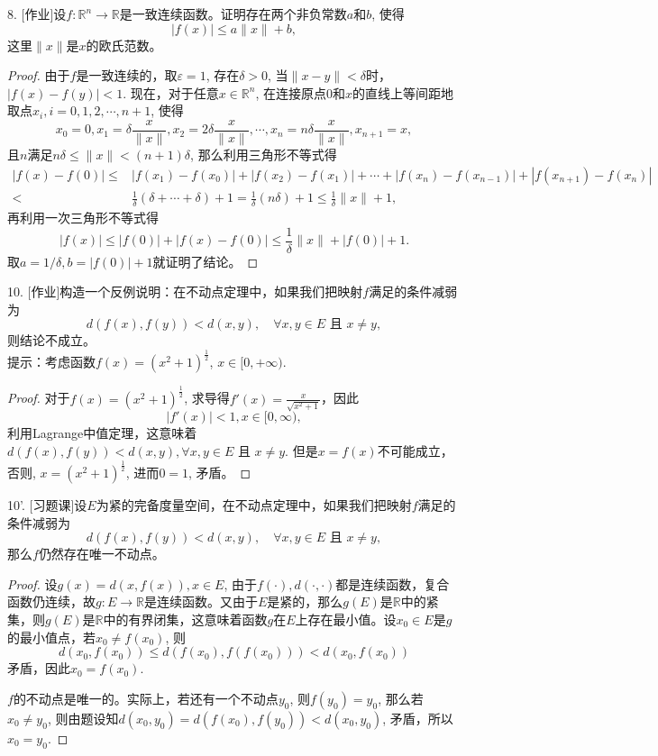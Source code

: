 \documentclass[a4paper,8pt]{ctexart}\textwidth 140mm \textheight 216mm
\newcommand{\e}{\varepsilon}
\newcommand{\8}{\infty}
\begin{document}
8. [作业]设$f:\mathbb{R}^n\to\mathbb{R}$是一致连续函数。证明存在两个非负常数$a$和$b$, 使得
$$|f(x)|\leq a\|x\|+b,$$
这里$\|x\|$是$x$的欧氏范数。
\begin{proof}
	由于$f$是一致连续的，取$\e=1$, 存在$\delta>0$, 当$\|x-y\|<\delta$时，$|f(x)-f(y)|<1$. 现在，对于任意$x\in\mathbb{R}^n$, 在连接原点$0$和$x$的直线上等间距地取点$x_i,i=0,1,2,\cdots,n+1$, 使得
	$$x_0=0,x_1=\delta\frac{x}{\|x\|},x_2=2\delta\frac{x}{\|x\|},\cdots,x_n=n\delta\frac{x}{\|x\|},x_{n+1}=x,$$
	且$n$满足$n\delta\leq \|x\|<(n+1)\delta$, 那么利用三角形不等式得
	\[\begin{split}
	|f(x)-f(0)|\leq& |f(x_1)-f(x_0)|+|f(x_2)-f(x_1)|+\cdots+|f(x_n)-f(x_{n-1})|+|f(x_{n+1})-f(x_n)|\\
	< & \frac{1}{\delta}(\delta+\cdots+\delta)+1=\frac{1}{\delta}(n\delta)+1\leq \frac{1}{\delta}\|x\|+1,
	\end{split}\]
	再利用一次三角形不等式得
	$$|f(x)|\leq |f(0)|+|f(x)-f(0)|\leq \frac{1}{\delta}\|x\|+|f(0)|+1.$$
	取$a=1/\delta, b=|f(0)|+1$就证明了结论。
\end{proof}

10. [作业]构造一个反例说明：在不动点定理中，如果我们把映射$f$满足的条件减弱为
$$d(f(x),f(y))<d(x,y),\quad\forall x,y\in E\mbox{ 且 }x\ne y,$$
则结论不成立。\\
提示：考虑函数$f(x)=(x^2+1)^{\frac{1}{2}}$, $x\in[0,+\infty)$.
\begin{proof}
	对于$f(x)=(x^2+1)^{\frac{1}{2}}$, 求导得$f'(x)=\frac{x}{\sqrt{x^2+1}}$，因此
	$$|f'(x)|<1,x\in[0,\infty),$$
	利用Lagrange中值定理，这意味着$d(f(x),f(y))<d(x,y),\forall x,y\in E\mbox{ 且 }x\ne y$. 但是$x=f(x)$不可能成立，否则, $x=(x^2+1)^{\frac{1}{2}}$, 进而$0=1$, 矛盾。 
\end{proof}

10'. [习题课]设$E$为紧的完备度量空间，在不动点定理中，如果我们把映射$f$满足的条件减弱为
$$d(f(x),f(y))<d(x,y),\quad\forall x,y\in E\mbox{ 且 }x\ne y,$$
那么$f$仍然存在唯一不动点。
\begin{proof}
	设$g(x)=d(x,f(x)), x\in E$, 由于$f(\cdot),d(\cdot,\cdot)$都是连续函数，复合函数仍连续，故$g:E\to \mathbb{R}$是连续函数。又由于$E$是紧的，那么$g(E)$是$\mathbb{R}$中的紧集，则$g(E)$是$\mathbb{R}$中的有界闭集，这意味着函数$g$在$E$上存在最小值。设$x_0\in E$是$g$的最小值点，若$x_0\ne f(x_0)$, 则
	$$d(x_0,f(x_0))\leq d(f(x_0),f(f(x_0)))<d(x_0,f(x_0))$$
    矛盾，因此$x_0=f(x_0)$. 
    
    $f$的不动点是唯一的。实际上，若还有一个不动点$y_0$, 则$f(y_0)=y_0$, 那么若$x_0\ne y_0$, 则由题设知$d(x_0,y_0)=d(f(x_0),f(y_0))<d(x_0,y_0)$, 矛盾，所以$x_0=y_0$.
\end{proof}
\end{document}
